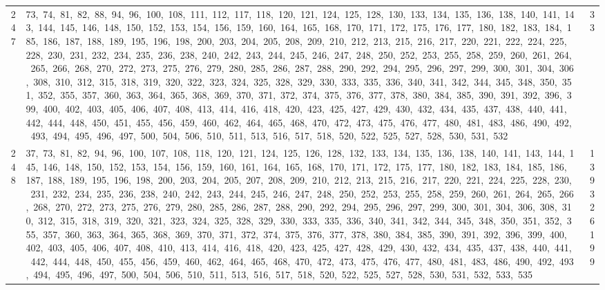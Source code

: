 \begin{longtable}{c|p{}|r}
247 & 73,\ 74,\ 81,\ 82,\ 88,\ 94,\ 96,\ 100,\ 108,\ 111,\ 112,\ 117,\ 118,\ 120,\ 121,\ 124,\ 125,\ 128,\ 130,\ 133,\ 134,\ 135,\ 136,\ 138,\ 140,\ 141,\ 143,\ 144,\ 145,\ 146,\ 148,\ 150,\ 152,\ 153,\ 154,\ 156,\ 159,\ 160,\ 164,\ 165,\ 168,\ 170,\ 171,\ 172,\ 175,\ 176,\ 177,\ 180,\ 182,\ 183,\ 184,\ 185,\ 186,\ 187,\ 188,\ 189,\ 195,\ 196,\ 198,\ 200,\ 203,\ 204,\ 205,\ 208,\ 209,\ 210,\ 212,\ 213,\ 215,\ 216,\ 217,\ 220,\ 221,\ 222,\ 224,\ 225,\ 228,\ 230,\ 231,\ 232,\ 234,\ 235,\ 236,\ 238,\ 240,\ 242,\ 243,\ 244,\ 245,\ 246,\ 247,\ 248,\ 250,\ 252,\ 253,\ 255,\ 258,\ 259,\ 260,\ 261,\ 264,\ 265,\ 266,\ 268,\ 270,\ 272,\ 273,\ 275,\ 276,\ 279,\ 280,\ 285,\ 286,\ 287,\ 288,\ 290,\ 292,\ 294,\ 295,\ 296,\ 297,\ 299,\ 300,\ 301,\ 304,\ 306,\ 308,\ 310,\ 312,\ 315,\ 318,\ 319,\ 320,\ 322,\ 323,\ 324,\ 325,\ 328,\ 329,\ 330,\ 333,\ 335,\ 336,\ 340,\ 341,\ 342,\ 344,\ 345,\ 348,\ 350,\ 351,\ 352,\ 355,\ 357,\ 360,\ 363,\ 364,\ 365,\ 368,\ 369,\ 370,\ 371,\ 372,\ 374,\ 375,\ 376,\ 377,\ 378,\ 380,\ 384,\ 385,\ 390,\ 391,\ 392,\ 396,\ 399,\ 400,\ 402,\ 403,\ 405,\ 406,\ 407,\ 408,\ 413,\ 414,\ 416,\ 418,\ 420,\ 423,\ 425,\ 427,\ 429,\ 430,\ 432,\ 434,\ 435,\ 437,\ 438,\ 440,\ 441,\ 442,\ 444,\ 448,\ 450,\ 451,\ 455,\ 456,\ 459,\ 460,\ 462,\ 464,\ 465,\ 468,\ 470,\ 472,\ 473,\ 475,\ 476,\ 477,\ 480,\ 481,\ 483,\ 486,\ 490,\ 492,\ 493,\ 494,\ 495,\ 496,\ 497,\ 500,\ 504,\ 506,\ 510,\ 511,\ 513,\ 516,\ 517,\ 518,\ 520,\ 522,\ 525,\ 527,\ 528,\ 530,\ 531,\ 532 & 33 \\
248 & 37,\ 73,\ 81,\ 82,\ 94,\ 96,\ 100,\ 107,\ 108,\ 118,\ 120,\ 121,\ 124,\ 125,\ 126,\ 128,\ 132,\ 133,\ 134,\ 135,\ 136,\ 138,\ 140,\ 141,\ 143,\ 144,\ 145,\ 146,\ 148,\ 150,\ 152,\ 153,\ 154,\ 156,\ 159,\ 160,\ 161,\ 164,\ 165,\ 168,\ 170,\ 171,\ 172,\ 175,\ 177,\ 180,\ 182,\ 183,\ 184,\ 185,\ 186,\ 187,\ 188,\ 189,\ 195,\ 196,\ 198,\ 200,\ 203,\ 204,\ 205,\ 207,\ 208,\ 209,\ 210,\ 212,\ 213,\ 215,\ 216,\ 217,\ 220,\ 221,\ 224,\ 225,\ 228,\ 230,\ 231,\ 232,\ 234,\ 235,\ 236,\ 238,\ 240,\ 242,\ 243,\ 244,\ 245,\ 246,\ 247,\ 248,\ 250,\ 252,\ 253,\ 255,\ 258,\ 259,\ 260,\ 261,\ 264,\ 265,\ 266,\ 268,\ 270,\ 272,\ 273,\ 275,\ 276,\ 279,\ 280,\ 285,\ 286,\ 287,\ 288,\ 290,\ 292,\ 294,\ 295,\ 296,\ 297,\ 299,\ 300,\ 301,\ 304,\ 306,\ 308,\ 310,\ 312,\ 315,\ 318,\ 319,\ 320,\ 321,\ 323,\ 324,\ 325,\ 328,\ 329,\ 330,\ 333,\ 335,\ 336,\ 340,\ 341,\ 342,\ 344,\ 345,\ 348,\ 350,\ 351,\ 352,\ 355,\ 357,\ 360,\ 363,\ 364,\ 365,\ 368,\ 369,\ 370,\ 371,\ 372,\ 374,\ 375,\ 376,\ 377,\ 378,\ 380,\ 384,\ 385,\ 390,\ 391,\ 392,\ 396,\ 399,\ 400,\ 402,\ 403,\ 405,\ 406,\ 407,\ 408,\ 410,\ 413,\ 414,\ 416,\ 418,\ 420,\ 423,\ 425,\ 427,\ 428,\ 429,\ 430,\ 432,\ 434,\ 435,\ 437,\ 438,\ 440,\ 441,\ 442,\ 444,\ 448,\ 450,\ 455,\ 456,\ 459,\ 460,\ 462,\ 464,\ 465,\ 468,\ 470,\ 472,\ 473,\ 475,\ 476,\ 477,\ 480,\ 481,\ 483,\ 486,\ 490,\ 492,\ 493,\ 494,\ 495,\ 496,\ 497,\ 500,\ 504,\ 506,\ 510,\ 511,\ 513,\ 516,\ 517,\ 518,\ 520,\ 522,\ 525,\ 527,\ 528,\ 530,\ 531,\ 532,\ 533,\ 535 & 139326199 \\

\end{longtable}
